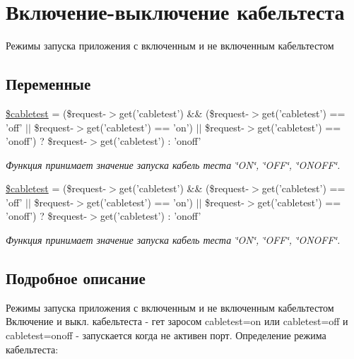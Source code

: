 \hypertarget{group__on__off__cabletest}{\section{Включение-\/выключение кабельтеста}
\label{group__on__off__cabletest}
}


Режимы запуска приложения с включенным и не включенным кабельтестом  


\subsection*{Переменные}
\begin{DoxyCompactItemize}
\item 
\hyperlink{group__on__off__cabletest_ga8a066b0c14b92b0fce632e27b8dd35c9}{\$cabletest} = (\$request-\/$>$get('cabletest') \&\& (\$request-\/$>$get('cabletest') == 'off' $\vert$$\vert$ \$request-\/$>$get('cabletest') == 'on') $\vert$$\vert$ \$request-\/$>$get('cabletest') == 'onoff') ? \$request-\/$>$get('cabletest') \-: 'onoff'
\begin{DoxyCompactList}\small\item\em Функция принимает значение запуска кабель теста \char`\"{}\-O\-N\char`\"{}, \char`\"{}\-O\-F\-F\char`\"{}, \char`\"{}\-O\-N\-O\-F\-F\char`\"{}. \end{DoxyCompactList}\item 
\hyperlink{group__on__off__cabletest_ga8a066b0c14b92b0fce632e27b8dd35c9}{\$cabletest} = (\$request-\/$>$get('cabletest') \&\& (\$request-\/$>$get('cabletest') == 'off' $\vert$$\vert$ \$request-\/$>$get('cabletest') == 'on') $\vert$$\vert$ \$request-\/$>$get('cabletest') == 'onoff') ? \$request-\/$>$get('cabletest') \-: 'onoff'
\begin{DoxyCompactList}\small\item\em Функция принимает значение запуска кабель теста \char`\"{}\-O\-N\char`\"{}, \char`\"{}\-O\-F\-F\char`\"{}, \char`\"{}\-O\-N\-O\-F\-F\char`\"{}. \end{DoxyCompactList}\end{DoxyCompactItemize}


\subsection{Подробное описание}
Режимы запуска приложения с включенным и не включенным кабельтестом Включение и выкл. кабельтеста -\/ гет заросом cabletest=on или cabletest=off и cabletest=onoff -\/ запускается когда не активен порт. Определение режима кабельтеста\-: 
 

